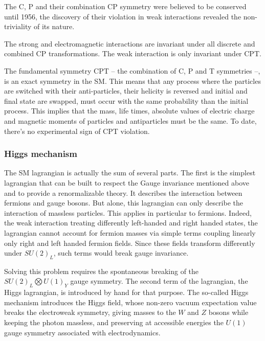 The C, P and their combination CP symmetry were believed to be conserved until 1956, the discovery of their violation \cite{lee_question_1956, wu_experimental_1957, christenson_evidence_1964} in weak interactions revealed the non-triviality of its nature.

The strong and electromagnetic interactions are invariant under all discrete and combined CP transformations. The weak interaction is only invariant under CPT.

The fundamental symmetry CPT -- the combination of C, P and T symmetries --, is an exact symmetry in the SM. This means that any process where the particles are switched with their anti-particles, their helicity is reversed and initial and final state are swapped, must occur with the same probability than the initial process. This implies that the mass, life times, absolute values of electric charge and magnetic moments of particles and antiparticles must be the same. To date, there's no experimental sign of CPT violation.

\subsubsection{Higgs mechanism}

The SM lagrangian is actually the sum of several parts. The first is the simplest lagrangian that can be built to respect the Gauge invariance mentioned above and to provide a renormalizable theory. It describes the interaction between fermions and gauge bosons. But alone, this lagrangian can only describe the interaction of massless particles. This applies in particular to fermions. Indeed, the weak interaction treating differently left-handed and right handed states, the lagrangian cannot account for fermion masses via simple terms coupling linearly only right and left handed fermion fields. Since these fields transform differently under $SU(2)_L$, such terms would break gauge invariance.

Solving this problem requires the spontaneous breaking of the $SU(2)_L \bigotimes U(1)_Y$ gauge symmetry. The second term of the lagrangian, the Higgs lagrangian, is introduced by hand for that purpose. The so-called Higgs mechanism introduces the Higgs field, whose non-zero vacuum expectation value breaks the electroweak symmetry, giving masses to the $W$ and $Z$ bosons while keeping the photon massless, and preserving at accessible energies the $U(1)$ gauge symmetry associated with electrodynamics.

